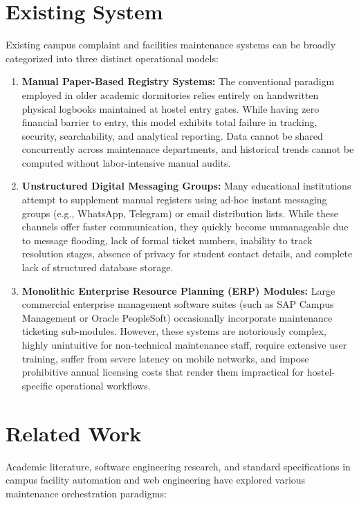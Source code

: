 \documentclass[10pt]{report}
\begin{document}
\section{Existing System}
\hspace{0.5cm}Existing campus complaint and facilities maintenance systems can be broadly categorized into three distinct operational models:
\begin{enumerate}
\item \textbf{Manual Paper-Based Registry Systems:} The conventional paradigm employed in older academic dormitories relies entirely on handwritten physical logbooks maintained at hostel entry gates. While having zero financial barrier to entry, this model exhibits total failure in tracking, security, searchability, and analytical reporting. Data cannot be shared concurrently across maintenance departments, and historical trends cannot be computed without labor-intensive manual audits.
\item \textbf{Unstructured Digital Messaging Groups:} Many educational institutions attempt to supplement manual registers using ad-hoc instant messaging groups (e.g., WhatsApp, Telegram) or email distribution lists. While these channels offer faster communication, they quickly become unmanageable due to message flooding, lack of formal ticket numbers, inability to track resolution stages, absence of privacy for student contact details, and complete lack of structured database storage.
\item \textbf{Monolithic Enterprise Resource Planning (ERP) Modules:} Large commercial enterprise management software suites (such as SAP Campus Management or Oracle PeopleSoft) occasionally incorporate maintenance ticketing sub-modules. However, these systems are notoriously complex, highly unintuitive for non-technical maintenance staff, require extensive user training, suffer from severe latency on mobile networks, and impose prohibitive annual licensing costs that render them impractical for hostel-specific operational workflows.
\end{enumerate}

\section{Related Work}
\hspace{0.5cm}Academic literature, software engineering research, and standard specifications in campus facility automation and web engineering have explored various maintenance orchestration paradigms:
\end{document}
